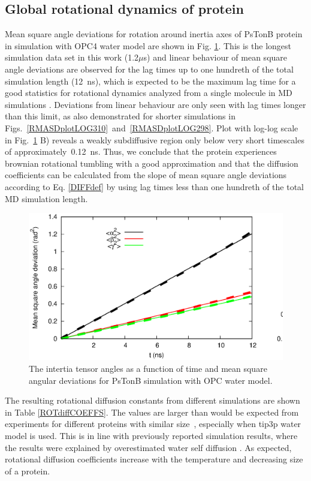 \documentclass[pre,aps,floatfix,authordate1-4,twocolumn]{revtex4-1}
\begin{document}
\subsection{Global rotational dynamics of protein}
Mean square angle deviations for rotation around inertia axes
of PsTonB protein in simulation with OPC4 water model
are shown in Fig. \ref{RMASDplot}. This is the longest
simulation data set in this work (1.2$\mu$s) and
linear behaviour of mean square angle deviations are observed
for the lag times up to one hundreth of the total simulation length (12~ns),
which is expected to be the maximum lag time for a good statistics
for rotational dynamics analyzed from a single molecule in MD simulations \cite{lu06}.
Deviations from linear behaviour are only seen with lag times longer
than this limit, as also demonstrated for shorter simulations in
Figs.~\ref{RMASDplotLOG310}~and~\ref{RMASDplotLOG298}.
Plot with log-log scale in Fig.~\ref{RMASDplot} B)
reveals a weakly subdiffusive region only below very short timescales
of approximately~0.12~ns. Thus, we conclude that the protein
experiences brownian rotational tumbling with  a good approximation
and that the diffusion coefficients can be calculated from the slope of mean square angle
deviations according to Eq. \ref{DIFFdef} by using lag times less than
one hundreth of the total MD simulation length.
\begin{figure}[htb]
  \includegraphics[width=16.5cm]{../Figs/RMASDplotPsTonBOPC4.eps}%
  \caption{The intertia tensor angles as a function of time and mean square angular
    deviations for PsTonB simulation with OPC water model.
    \label{RMASDplot}}%
\end{figure}

The resulting rotational diffusion constants from different simulations are
shown in Table \ref{ROTdiffCOEFFS}. The values are larger than would be
expected from experiments for different proteins with similar
size~\cite{krishnan98}, especially when tip3p water model is used.
This is in line with previously reported simulation results,
where the results were explained by overestimated water self
diffusion \cite{wong08}. As expected, rotational diffusion coefficients
increase with the temperature and decreasing size of a protein.
\end{document}
